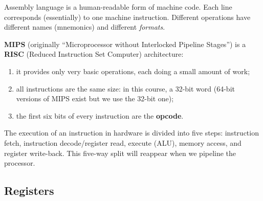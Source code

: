 Assembly language is a human-readable form of machine code. Each line
corresponds (essentially) to one machine instruction. Different operations
have different names (mnemonics) and different \emph{formats}.

\begin{definition}
\textbf{MIPS} (originally ``Microprocessor without Interlocked Pipeline
Stages'') is a \textbf{RISC} (Reduced Instruction Set Computer) architecture:
\begin{enumerate}
  \item it provides only very basic operations, each doing a small amount of
    work;
  \item all instructions are the same size: in this course, a 32-bit word
    (64-bit versions of MIPS exist but we use the 32-bit one);
  \item the first six bits of every instruction are the \textbf{opcode}.
\end{enumerate}
\end{definition}

The execution of an instruction in hardware is divided into five steps:
instruction fetch, instruction decode/register read, execute (ALU), memory
access, and register write-back. This five-way split will reappear when we
pipeline the processor.

\begin{center}
\end{center}

\subsection{Registers}

